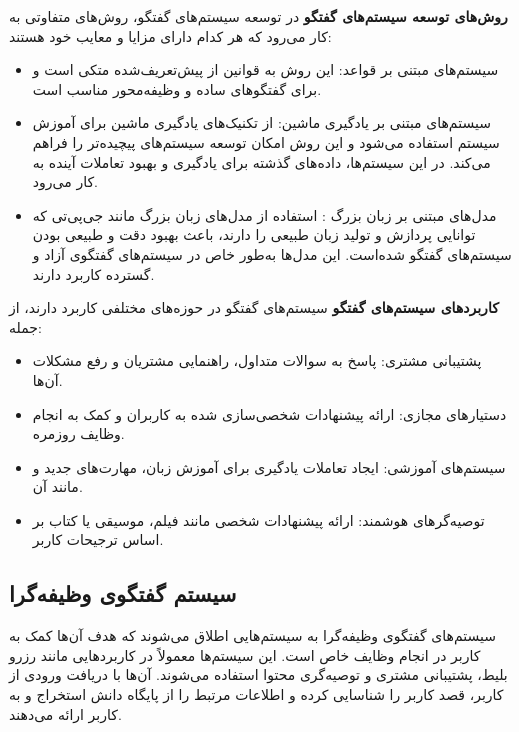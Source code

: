 \textbf{روش‌های توسعه سیستم‌های گفتگو}\newline
در توسعه سیستم‌های گفتگو، روش‌های متفاوتی به کار می‌رود که هر کدام دارای مزایا و معایب خود هستند:

\begin{itemize}
\item
سیستم‌های مبتنی بر قواعد: این روش به قوانین از پیش‌تعریف‌شده متکی است و برای گفتگوهای ساده و وظیفه‌محور مناسب است.
\item
سیستم‌های مبتنی بر یادگیری ماشین: از تکنیک‌های یادگیری ماشین برای آموزش سیستم استفاده می‌شود و این روش امکان توسعه سیستم‌های پیچیده‌تر را فراهم می‌کند. در این سیستم‌ها، داده‌های گذشته برای یادگیری و بهبود تعاملات آینده به کار می‌رود.
\item
مدل‌های مبتنی بر زبان بزرگ%
: استفاده از مدل‌های زبان بزرگ مانند جی‌پی‌تی که توانایی پردازش و تولید زبان طبیعی را دارند، باعث بهبود دقت و طبیعی بودن سیستم‌های گفتگو شده‌است. این مدل‌ها به‌طور خاص در سیستم‌های گفتگوی آزاد و گسترده کاربرد دارند.

\end{itemize}

\textbf{کاربردهای سیستم‌های گفتگو}\newline
سیستم‌های گفتگو در حوزه‌های مختلفی کاربرد دارند، از جمله:
\begin{itemize}
\item
پشتیبانی مشتری: پاسخ به سوالات متداول، راهنمایی مشتریان و رفع مشکلات آن‌ها.
\item
دستیارهای مجازی: ارائه پیشنهادات شخصی‌سازی شده به کاربران و کمک به انجام وظایف روزمره.
\item
سیستم‌های آموزشی: ایجاد تعاملات یادگیری برای آموزش زبان، مهارت‌های جدید و مانند آن.
\item
توصیه‌گرهای هوشمند: ارائه پیشنهادات شخصی مانند فیلم، موسیقی یا کتاب بر اساس ترجیحات کاربر.
\end{itemize}

\subsection{سیستم گفتگوی وظیفه‌گرا}
سیستم‌های گفتگوی وظیفه‌گرا%
 به سیستم‌هایی اطلاق می‌شوند که هدف آن‌ها کمک به کاربر در انجام وظایف خاص است. این سیستم‌ها معمولاً در کاربردهایی مانند رزرو بلیط، پشتیبانی مشتری و توصیه‌گری محتوا استفاده می‌شوند. آن‌ها با دریافت ورودی از کاربر، قصد کاربر را شناسایی کرده و اطلاعات مرتبط را از پایگاه دانش استخراج و به کاربر ارائه می‌دهند.

